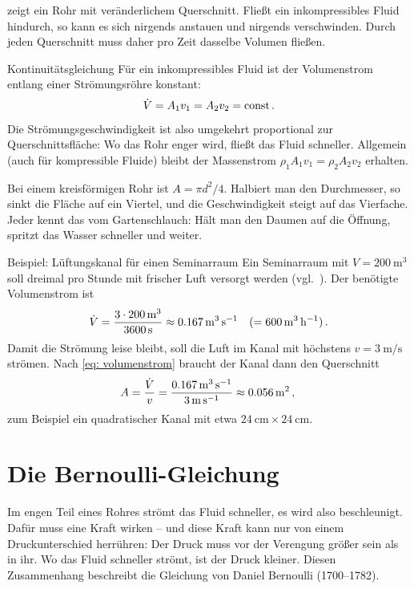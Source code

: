  zeigt ein Rohr mit veränderlichem Querschnitt. Fließt ein inkompressibles Fluid hindurch, so kann es sich nirgends anstauen und nirgends verschwinden. Durch jeden Querschnitt muss daher pro Zeit dasselbe Volumen fließen.
\begin{rememberbox}{Kontinuitätsgleichung}
    Für ein inkompressibles Fluid ist der Volumenstrom entlang einer Strömungsröhre konstant:
    \begin{equation}\label{eq: kontinuitaetsgleichung}
        \dot{V} = A_1 v_1 = A_2 v_2 = \mathrm{const} \,.
    \end{equation}
    Die Strömungsgeschwindigkeit ist also umgekehrt proportional zur Querschnittsfläche: Wo das Rohr enger wird, fließt das Fluid schneller. Allgemein (auch für kompressible Fluide) bleibt der Massenstrom $\rho_1 A_1 v_1 = \rho_2 A_2 v_2$ erhalten.
\end{rememberbox}
Bei einem kreisförmigen Rohr ist $A = \pi d^2/4$. Halbiert man den Durchmesser, so sinkt die Fläche auf ein Viertel, und die Geschwindigkeit steigt auf das Vierfache. Jeder kennt das vom Gartenschlauch: Hält man den Daumen auf die Öffnung, spritzt das Wasser schneller und weiter.

\begin{examplebox}[]{Beispiel: Lüftungskanal für einen Seminarraum}
    Ein Seminarraum mit $V = \SI{200}{\meter\cubed}$ soll dreimal pro Stunde mit frischer Luft versorgt werden (vgl.~\cite[S.~464]{Giancoli2010}). Der benötigte Volumenstrom ist
    \begin{equation*}
        \dot{V} = \frac{3 \cdot \SI{200}{\meter\cubed}}{\SI{3600}{\second}} \approx \SI{0.167}{\meter\cubed\per\second} \quad (= \SI{600}{\meter\cubed\per\hour}) \,.
    \end{equation*}
    Damit die Strömung leise bleibt, soll die Luft im Kanal mit höchstens $v = \SI{3}{\meter\per\second}$ strömen. Nach \cref{eq: volumenstrom} braucht der Kanal dann den Querschnitt
    \begin{equation*}
        A = \frac{\dot{V}}{v} = \frac{\SI{0.167}{\meter\cubed\per\second}}{\SI{3}{\meter\per\second}} \approx \SI{0.056}{\meter\squared} \,{,}\,
    \end{equation*}
    zum Beispiel ein quadratischer Kanal mit etwa $\SI{24}{\centi\meter} \times \SI{24}{\centi\meter}$.
\end{examplebox}

\section{Die Bernoulli-Gleichung}\label{sec: bernoulli}
Im engen Teil eines Rohres strömt das Fluid schneller, es wird also beschleunigt. Dafür muss eine Kraft wirken -- und diese Kraft kann nur von einem Druckunterschied herrühren: Der Druck muss vor der Verengung größer sein als in ihr. Wo das Fluid schneller strömt, ist der Druck kleiner. Diesen Zusammenhang beschreibt die Gleichung von Daniel Bernoulli (1700--1782).


